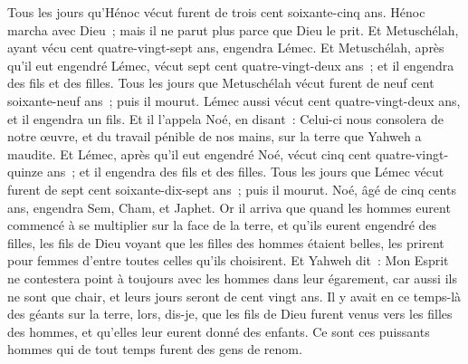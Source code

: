 \begin{multicols}{2}
Tous les jours qu'Hénoc vécut furent de trois cent soixante-cinq ans.
Hénoc marcha avec Dieu~; mais il ne parut plus parce que Dieu le prit.
Et Metuschélah, ayant vécu cent quatre-vingt-sept ans, engendra Lémec.
Et Metuschélah, après qu'il eut engendré Lémec, vécut sept cent quatre-vingt-deux ans~; et il engendra des fils et des filles.
Tous les jours que Metuschélah vécut furent de neuf cent soixante-neuf ans~; puis il mourut.
Lémec aussi vécut cent quatre-vingt-deux ans, et il engendra un fils.
Et il l'appela Noé, en disant~: Celui-ci nous consolera de notre œuvre, et du travail pénible de nos mains, sur la terre que Yahweh a maudite.
Et Lémec, après qu'il eut engendré Noé, vécut cinq cent quatre-vingt-quinze ans~; et il engendra des fils et des filles.
Tous les jours que Lémec vécut furent de sept cent soixante-dix-sept ans~; puis il mourut.
Noé, âgé de cinq cents ans, engendra Sem, Cham, et Japhet.
\VerseOne{}Or il arriva que quand les hommes eurent commencé à se multiplier sur la face de la terre, et qu'ils eurent engendré des filles,
les fils de Dieu voyant que les filles des hommes étaient belles, les prirent pour femmes d'entre toutes celles qu'ils choisirent.
Et Yahweh dit~: Mon Esprit ne contestera point à toujours avec les hommes dans leur égarement, car aussi ils ne sont que chair, et leurs jours seront de cent vingt ans.
Il y avait en ce temps-là des géants sur la terre, lors, dis-je, que les fils de Dieu furent venus vers les filles des hommes, et qu'elles leur eurent donné des enfants. Ce sont ces puissants hommes qui de tout temps furent des gens de renom.

\end{multicols}
